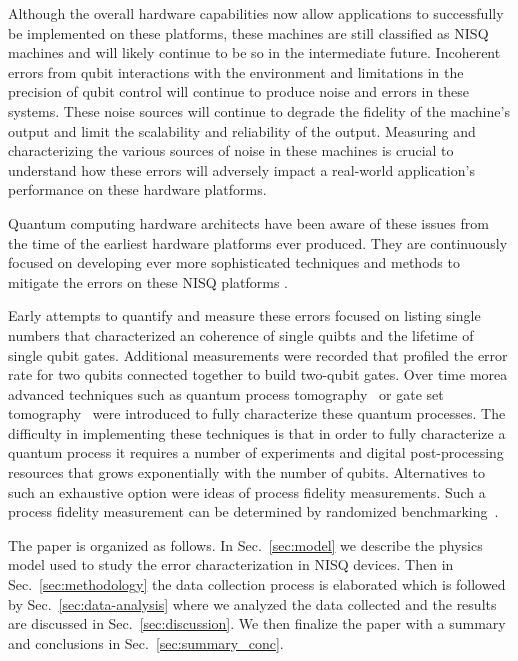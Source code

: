 
Although the overall hardware capabilities now allow applications to successfully be implemented on these platforms, these machines are still classified as NISQ machines and will likely continue to be so in the intermediate future.  Incoherent errors from qubit interactions with the environment and limitations in the precision of qubit control will continue to produce noise and errors in these systems.  These noise sources will continue to degrade the fidelity of the machine’s output and limit the scalability and reliability of the output.  Measuring and characterizing the various sources of noise in these machines is crucial to understand how these errors will adversely impact a real-world application’s performance on these hardware platforms.

Quantum computing hardware architects have been aware of these issues from the time of the earliest hardware platforms ever produced.  They are continuously focused on developing ever more sophisticated techniques and methods to mitigate the errors on these NISQ platforms {\color{red}{KYA: Cite a few error mitigation papers}}.  

Early attempts to quantify and measure these errors focused on listing single numbers that characterized an coherence of single quibts and the lifetime of single qubit gates.  Additional measurements were recorded that profiled the error rate for two qubits connected together to build two-qubit gates.  Over time morea advanced techniques such as quantum process tomography~\cite{ref:Chuang1997} or gate set tomography~\cite{ref:Merkel2012,ref:Blume-Kohout2013,ref:Blume-Kohout2017} were introduced to fully characterize these quantum processes.  The difficulty in implementing these techniques is that in order to fully characterize a quantum process it requires a number of experiments and digital post-processing resources that grows exponentially with the number of qubits.  Alternatives to such an exhaustive option were ideas of process fidelity measurements.  Such a process fidelity measurement can be determined by randomized benchmarking~\cite{ref:Emerson2005,ref:Dankert2009,ref:Magesan2011}.


The paper is organized as follows. In Sec.~\ref{sec:model} we describe the physics model used to study the error characterization in NISQ devices. Then in Sec.~\ref{sec:methodology} the data collection process is elaborated which is followed by Sec.~\ref{sec:data-analysis} where we analyzed the data collected and the results are discussed in Sec.~\ref{sec:discussion}. We then finalize the paper with a summary and conclusions in Sec.~\ref{sec:summary_conc}. 